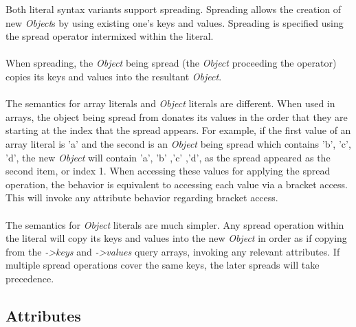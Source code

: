 \documentclass[12pt,letterpaper]{report}
\begin{document}
Both literal syntax variants support spreading. Spreading allows the creation 
of new \textit{Object}s by using existing one's keys and values. Spreading is 
specified using the spread operator intermixed within the literal.
\\\\
When spreading, the \textit{Object} being spread (the \textit{Object} proceeding the operator)
copies its keys and values into the resultant \textit{Object}.
\\\\
The semantics for array literals and \textit{Object} literals are different.
When used in arrays, the object being spread from donates its values in the order 
that they are starting at the index that the spread appears. For example, 
if the first value of an array literal is 'a' and the second is an \textit{Object} 
being spread which contains 'b', 'c', 'd', the new \textit{Object} will contain 
'a', 'b' ,'c' ,'d', as the spread appeared as the second item, or index 1.
When accessing these values for applying the spread operation, the behavior is 
equivalent to accessing each value via a bracket access. This will invoke 
any attribute behavior regarding bracket access.
\\\\
The semantics for \textit{Object} literals are much simpler. Any spread operation 
within the literal will copy its keys and values into the new \textit{Object}
in order as if copying from the \textit{->keys} and \textit{->values} query arrays, invoking any relevant attributes.
If multiple spread operations cover the same keys, the later spreads will take precedence.





\subsection{Attributes}\label{Attributes}
\end{document}
